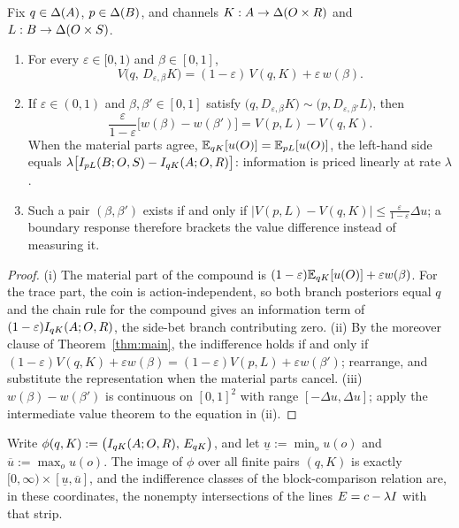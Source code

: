 \begin{proposition}\label{prop:wtp}
Fix $q\in\Delta(A)$, $p\in\Delta(B)$, and channels $K:A\to\Delta(O\times R)$ and $L:B\to\Delta(O\times S)$.
\begin{enumerate}[label=\textup{(\roman*)},leftmargin=*]
\item For every $\varepsilon\in[0,1)$ and $\beta\in[0,1]$,
\[
 V\bigl(q,\,D_{\varepsilon,\beta}K\bigr)=(1-\varepsilon)\,V(q,K)+\varepsilon\,w(\beta).
\]
\item If $\varepsilon\in(0,1)$ and $\beta,\beta'\in[0,1]$ satisfy
$\bigl(q,D_{\varepsilon,\beta}K\bigr)\sim\bigl(p,D_{\varepsilon,\beta'}L\bigr)$, then
\[
 \frac{\varepsilon}{1-\varepsilon}\bigl[w(\beta)-w(\beta')\bigr]
 =V(p,L)-V(q,K).
\]
When the material parts agree, $\mathbb E_{qK}[u(O)]=\mathbb E_{pL}[u(O)]$, the left-hand side equals
$\lambda\bigl[I_{pL}(B;O,S)-I_{qK}(A;O,R)\bigr]$: information is priced linearly at rate $\lambda$.
\item Such a pair $(\beta,\beta')$ exists if and only if
$\lvert V(p,L)-V(q,K)\rvert\le\frac{\varepsilon}{1-\varepsilon}\Delta u$; a boundary response therefore brackets
the value difference instead of measuring it.
\end{enumerate}
\end{proposition}

\begin{proof}
(i) The material part of the compound is $(1-\varepsilon)\mathbb E_{qK}[u(O)]+\varepsilon w(\beta)$.  For the trace part,
the coin is action-independent, so both branch posteriors equal $q$ and the chain rule for the compound gives an
information term of $(1-\varepsilon)I_{qK}(A;O,R)$, the side-bet branch contributing zero.
(ii) By the moreover clause of Theorem~\ref{thm:main}, the indifference holds if and only if
$(1-\varepsilon)V(q,K)+\varepsilon w(\beta)=(1-\varepsilon)V(p,L)+\varepsilon w(\beta')$; rearrange, and
substitute the representation when the material parts cancel.
(iii) $w(\beta)-w(\beta')$ is continuous on $[0,1]^2$ with range $[-\Delta u,\Delta u]$; apply the intermediate
value theorem to the equation in \textup{(ii)}.
\end{proof}

\begin{lemma}\label{lem:info-payoff-plane}
Write $\phi(q,K):=\bigl(I_{qK}(A;O,R),\,E_{qK}\bigr)$, and let $\underline u:=\min_ou(o)$ and
$\overline u:=\max_ou(o)$.  The image of $\phi$ over all finite pairs $(q,K)$ is exactly
$[0,\infty)\times[\underline u,\overline u]$, and the indifference classes of the block-comparison relation are,
in these coordinates, the nonempty intersections of the lines $E=c-\lambda I$ with that strip.
\end{lemma}

